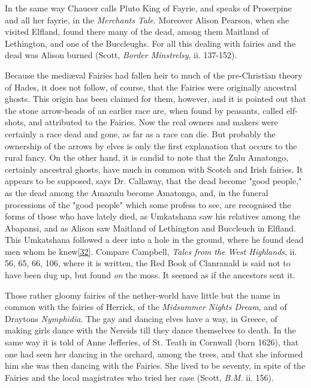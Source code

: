 \documentclass[14pt,a4paper]{memoir}
\begin{document}
In the same way Chaucer calls Pluto \textquotesingle King of
Fayrie,\textquotesingle{} and speaks of \textquotesingle Proserpine and
all her fayrie,\textquotesingle{} in the
\emph{Merchant\textquotesingle s Tale}. Moreover Alison Pearson, when
she visited Elfland, found there many of the dead, among them Maitland
of Lethington, and one of the Buccleughs. For all this dealing with
fairies and the dead was Alison burned (Scott, \emph{Border Minstrelsy},
ii. 137-152).

Because the mediæval Fairies had fallen heir to much of the
pre-Christian theory of Hades, it does not follow, of course, that the
Fairies were originally ancestral ghosts. This origin has been claimed
for them, however, and it is pointed out that the stone arrow-heads of
an earlier race are, when found by peasants, called
\textquotesingle elf-shots,\textquotesingle{} and attributed to the
Fairies. Now the real owners and makers were certainly a race dead and
gone, as far as a race can die. But probably the ownership of the arrows
by elves is only the first explanation that occurs to the rural fancy.
On the other hand, it is candid to note that the Zulu Amatongo,
certainly \textquotesingle ancestral ghosts,\textquotesingle{} have much
in common with Scotch and Irish fairies. \textquotesingle It appears to
be supposed,\textquotesingle{} says Dr. Callaway, \textquotesingle that
the dead become "good people," as the dead among the Amazulu become
Amatongo, and, in the funeral processions of the "good people" which
some profess to see, are recognised the forms of those who have lately
died, as Umkatshana saw his relatives among the
Abapansi,\textquotesingle{} and as Alison saw Maitland of Lethington and
Buccleuch in Elfland. This Umkatshana followed a deer into a hole in the
ground, where he found dead men whom he
knew\protect\hypertarget{4533318093929944247_33931-h-0.htm.xhtmlux5cux23FNanchor_32}{}{}\protect\hyperlink{4533318093929944247_33931-h-0.htm.xhtmlux5cux23Footnote_32}{{[}32{]}}.
Compare Campbell, \emph{Tales from the West Highlands}, ii. 56, 65, 66,
106, where it is written, \textquotesingle the Red Book of Clanranald is
said not to have been dug up, but found \emph{on} the moss. It seemed as
if the ancestors sent it.\textquotesingle{}

Those rather gloomy fairies of the nether-world have little but the name
in common with the fairies of Herrick, of the \emph{Midsummer
Night\textquotesingle s Dream}, and of Drayton\textquotesingle s
\emph{Nymphidia}. The gay and dancing elves have a way, in Greece, of
making girls \textquotesingle dance with the Nereids\textquotesingle{}
till they dance themselves to death. In the same way it is told of Anne
Jefferies, of St. Teath in Cornwall (born 1626), that one had seen her
\textquotesingle dancing in the orchard, among the trees, and that she
informed him she was then dancing with the Fairies.\textquotesingle{}
She lived to be seventy, in spite of the Fairies and the local
magistrates who tried her case (Scott, \emph{B.M.} ii. 156).
\end{document}
